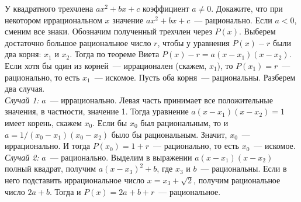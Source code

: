 \problem
У квадратного трехчлена $a x^2 + b x + c$ коэффициент $a \neq 0$.
Докажите, что при некотором иррациональном $x$ значение
$a x^2 + b x + c$~--- рационально.
\solution
Если $a < 0$, сменим все знаки.
Обозначим полученный трехчлен через $P(x)$.
Выберем достаточно большое рациональное число $r$, чтобы у уравнения
$P(x) - r$ были два корня: $x_1$ и $x_2$.
Тогда по теореме Виета $P(x) - r = a (x - x_1) (x - x_2)$.
Если хотя бы один из корней~--- иррационален (скажем, $x_1$), то
$P(x_1) = r$~--- рационально, то есть $x_1$~--- искомое.
Пусть оба корня~--- рациональны.
Разберем два случая.
\\
\emph{Случай 1:} $a$~--- иррационально.
Левая часть принимает все положительные значения, в частности, значение 1.
Тогда уравнение $a (x - x_1) (x - x_2) = 1$ имеет корень, скажем $x_0$.
Если бы  $x_0$ был рациональным, то и $a = 1 / (x_0 - x_1) (x_0 - x_2)$ было бы
рациональным.
Значит, $x_0$~--- иррационально.
И тогда $P(x_0) = 1 + r$~--- рационально, то есть $x_0$~--- искомое.
\\
\emph{Случай 2:} $a$~--- рационально.
Выделим в выражении $a (x - x_1) (x - x_2)$ полный квадрат, получим
$a (x - x_3)^2 + b$, где $x_3$ и $b$~--- рациональны.
Если в него подставить иррациональное число $x = x_3 + \sqrt{2}$, получим
рациональное число $2 a + b$.
Тогда и $P(x) = 2 a + b + r$~--- рациональное. 
\endproblem
